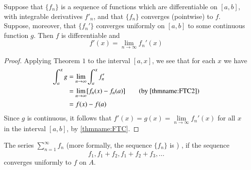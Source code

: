 \documentclass[12pt, a4paper, oneside, openright, titlepage]{book}
\begin{document}
\begin{thm}
    Suppose that $\{f_n\}$ is a sequence of functions which are differentiable on $[a,b]$, with integrable derivatives $f'_n$, and that $\{f_n\}$ converges (pointwise) to $f$. Suppose, moreover, that $\{f_n'\}$ converges uniformly on $[a,b]$ to some continuous function $g$. Then $f$ is differentiable and \begin{equation*}
        f'(x) = \lim\limits_{n\rightarrow \infty}f_n'(x)
    \end{equation*}
\end{thm}
\begin{proof}
    Applying Theorem $1$ to the interval $[a,x]$, we see that for each $x$ we have \begin{align*}
        \int_a^xg &= \lim\limits_{n\rightarrow \infty}\int_a^xf'_n \\
        &= \lim\limits_{n\rightarrow \infty}[f_n(x) - f_n(a)] \tag{by \ref{thmname:FTC2}} \\
        &= f(x) - f(a)
    \end{align*}
    Since $g$ is continuous, it follows that $f'(x) = g(x) = \lim\limits_{n\rightarrow \infty}f_n'(x)$ for all $x$ in the interval $[a,b]$, by \ref{thmname:FTC}.
\end{proof}

\begin{defn}
    The series $\sum\limits_{n=1}^{\infty}f_n$  (more formally, the sequence $\{f_n\}$ is ) , if the sequence \begin{equation*}
        f_1, f_1+f_2,f_1+f_2+f_3,...
    \end{equation*}
    converges uniformly to $f$ on $A$.
\end{defn}
\end{document}

